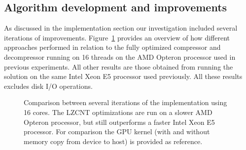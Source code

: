 \subsection{Algorithm development and improvements}
As discussed in the implementation section our investigation included several iterations of improvements. Figure~\ref{ALG_DEV_COMPARISON} provides an overview of how
different approaches performed in relation to the fully optimized compressor and decompressor running on 16 threads on the AMD Opteron processor used in previous experiments.
All other results are those obtained from running the solution on the same Intel Xeon E5 processor used previously. All these results excludes disk I/O operations. 
\begin{figure}[ht!]
 \begin{mdframed}
 \centering
  \caption[Comparison of project iterations]{Comparison between several iterations of the implementation using 16 cores. The LZCNT optimizations are run on a slower AMD Opteron processor, but still outperforms a faster
  Intel Xeon E5 processor. For comparison the GPU kernel (with and without memory copy from device to host) is provided as reference.}
  \label{ALG_DEV_COMPARISON}
 \end{mdframed}
\end{figure} 
